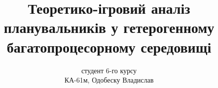 \author{студент 6-го курсу\\ КА-61м, Одобеску Владислав}
\title{Теоретико-ігровий аналіз планувальників у гетерогенному багатопроцесорному середовищі}
\date{}

